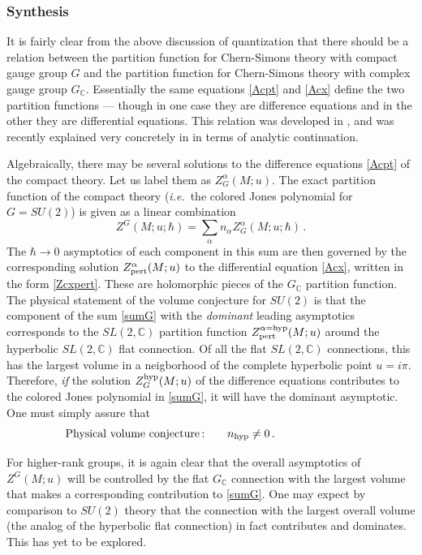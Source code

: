 \documentclass[letterpaper,12pt]{article}
\numberwithin{equation}{section}
\newcommand{\ie}{\emph{i.e.}}
\newcommand{\be}{\begin{equation}}
\newcommand{\ee}{\end{equation}}
\newcommand{\C}{{\mathbb{C}}}
\renewcommand{\=}{\;=\;}
\begin{document}

\subsubsection{Synthesis}
\label{sec:path}

It is fairly clear from the above discussion of quantization that there should be a relation between the partition function for Chern-Simons theory with compact gauge group $G$ and the partition function for Chern-Simons theory with complex gauge group $G_\C$. Essentially the same equations \eqref{Acpt} and \eqref{Acx} define the two partition functions --- though in one case they are difference equations and in the other they are differential equations. This relation was developed in \cite{gukov-2003, DGLZ}, and was recently explained very concretely in \cite{Wit-anal} in terms of analytic continuation.

Algebraically, there may be several solutions to the difference equations \eqref{Acpt} of the compact theory.
Let us label them as $Z^{\alpha}_G(M;u)$.
The exact partition function of the compact theory
(\ie\ the colored Jones polynomial for $G=SU(2)$)
is given as a linear combination
%
\be Z^G(M;u;\hbar) = \sum_\alpha n_\alpha Z^\alpha_G(M;u;\hbar)\,. \label{sumG} \ee
%
The $\hbar\to 0$ asymptotics of each component in this sum
are then governed by the corresponding solution $Z^\alpha_{\rm pert}(M;u)$
to the differential equation \eqref{Acx}, written in the form \eqref{Zcxpert}.
These are holomorphic pieces of the $G_\C$ partition function.
The physical statement of the volume conjecture for $SU(2)$
is that the component of the sum \eqref{sumG} with the \emph{dominant}
leading asymptotics corresponds to the $SL(2,\C)$
partition function $Z^{\alpha=\rm hyp}_{\rm pert}(M;u)$
around the hyperbolic $SL(2,\C)$ flat connection.
Of all the flat $SL(2,\C)$ connections, this has the largest volume
in a neigborhood of the complete hyperbolic point $u=i\pi$.
Therefore, \emph{if} the solution $Z^{\rm hyp}_G(M;u)$
of the difference equations contributes to the colored Jones polynomial in \eqref{sumG},
it will have the dominant asymptotic. One must simply assure that
%
\be \text{Physical volume conjecture\,:}\qquad  n_{\rm hyp}\neq 0\,.\hspace{1in} \ee
%

For higher-rank groups, it is again clear that the overall asymptotics of $Z^G(M;u)$ will be controlled by the flat $G_\C$ connection with the largest volume that makes a corresponding contribution to \eqref{sumG}. One may expect by comparison to $SU(2)$ theory that the connection with the largest overall volume (the analog of the hyperbolic flat connection) in fact contributes and dominates. This has yet to be explored. \\
\end{document}
